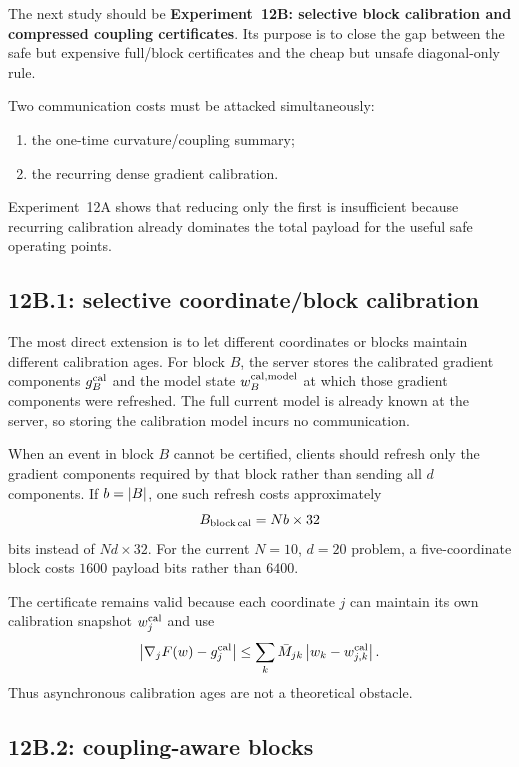 The next study should be \textbf{Experiment~12B: selective block calibration and compressed coupling certificates}. Its purpose is to close the gap between the safe but expensive full/block certificates and the cheap but unsafe diagonal-only rule.

Two communication costs must be attacked simultaneously:
\begin{enumerate}
  \item the one-time curvature/coupling summary;
  \item the recurring dense gradient calibration.
\end{enumerate}
Experiment~12A shows that reducing only the first is insufficient because recurring calibration already dominates the total payload for the useful safe operating points.

\subsection{12B.1: selective coordinate/block calibration}

The most direct extension is to let different coordinates or blocks maintain different calibration ages. For block $B$, the server stores the calibrated gradient components $g_B^{\rm cal}$ and the model state $w_B^{\rm cal,model}$ at which those gradient components were refreshed. The full current model is already known at the server, so storing the calibration model incurs no communication.

When an event in block $B$ cannot be certified, clients should refresh only the gradient components required by that block rather than sending all $d$ components. If $b=\left|B\right|$, one such refresh costs approximately
\begin{equation}
  B_{\rm block\,cal}=N b\times32
\end{equation}
bits instead of $Nd\times32$. For the current $N=10$, $d=20$ problem, a five-coordinate block costs $1600$ payload bits rather than $6400$.

The certificate remains valid because each coordinate $j$ can maintain its own calibration snapshot $w_j^{\rm cal}$ and use
\begin{equation}
  \left|\nabla_jF(w)-g_j^{\rm cal}\right|
  \leq
  \sum_k\bar M_{jk}\left|w_k-w_{j,k}^{\rm cal}\right|.
\end{equation}
Thus asynchronous calibration ages are not a theoretical obstacle.

\subsection{12B.2: coupling-aware blocks}

